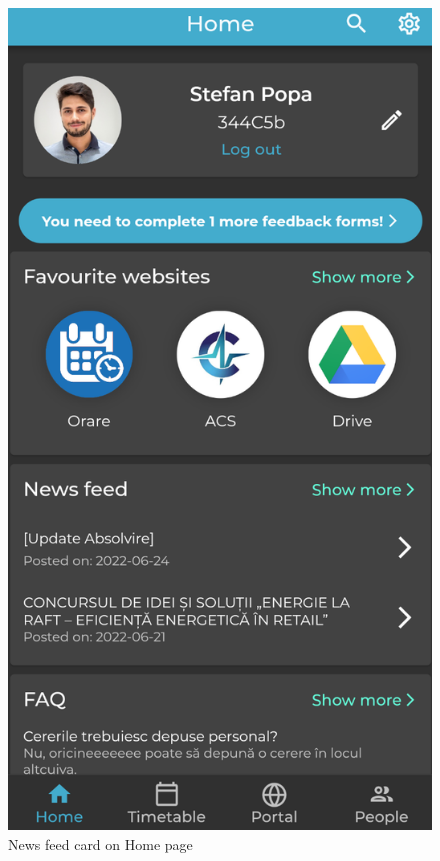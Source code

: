 \begin{figure}[!ht]
    \centering
    \begin{minipage}[b]{0.32\textwidth}
        \captionsetup{justification=centering}
        \includegraphics[width=\textwidth]{figures/app/final/home-page-final.png}
        \caption{News feed card on Home page}

\end{minipage}
\end{figure}
